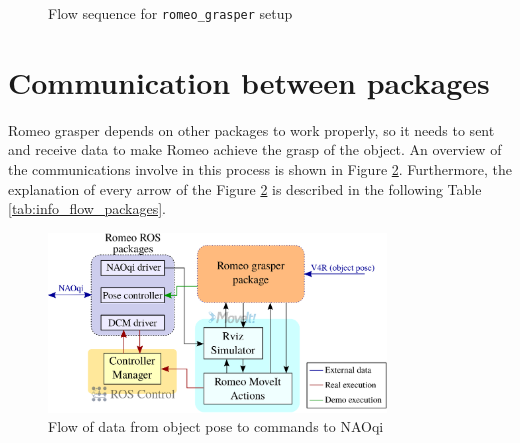 \documentclass[12pt,a4paper,final,twoside,openright]{report}
\begin{document}
\begin{figure}[!h]
\centering

\caption{Flow sequence for \texttt{romeo\_grasper} setup\label{fig:setup_romeo_grasper}}
\end{figure}

\newpage
\section{Communication between packages}

Romeo grasper depends on other packages to work properly, so it needs to sent and receive data to make Romeo achieve the grasp of the object. An overview of the communications involve in this process is shown in Figure \ref{fig:communication_all_packages}. Furthermore, the explanation of every arrow of the Figure \ref{fig:communication_all_packages} is described in the following Table \ref{tab:info_flow_packages}.

\begin{figure}[!h]
\centering
\includegraphics[width=0.8\textwidth]{images/move_control_overview.eps}
\caption{Flow of data from object pose to commands to NAOqi\label{fig:communication_all_packages}}
\end{figure}
\end{document}
